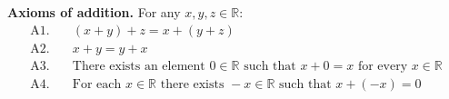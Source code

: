 \textbf{Axioms of addition.} For any $x, y, z \in \mathbb{R}$:
\begin{align}
\text{A1.}&\quad (x + y) + z = x + (y + z) \\
\text{A2.}&\quad x + y = y + x \\
\text{A3.}&\quad \text{There exists an element } 0 \in \mathbb{R} \text{ such that } x + 0 = x \text{ for every } x \in \mathbb{R} \\
\text{A4.}&\quad \text{For each } x \in \mathbb{R} \text{ there exists } -x \in \mathbb{R} \text{ such that } x + (-x) = 0
\end{align}
